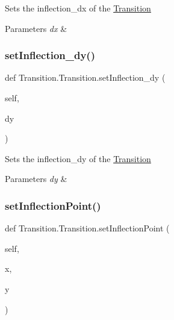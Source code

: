 Sets the inflection\+\_\+dx of the \mbox{\hyperlink{classTransition_1_1Transition}{Transition}}   


\begin{DoxyParams}{Parameters}
{\em dx} & \\
\hline
\end{DoxyParams}
\mbox{\label{classTransition_1_1Transition_a45a43d47163d7809870bfe7eb0e7613b}} 
\subsubsection{\texorpdfstring{setInflection\_dy()}{setInflection\_dy()}}
{\footnotesize\ttfamily def Transition.\+Transition.\+set\+Inflection\+\_\+dy (\begin{DoxyParamCaption}\item[{}]{self,  }\item[{}]{dy }\end{DoxyParamCaption})}



Sets the inflection\+\_\+dy of the \mbox{\hyperlink{classTransition_1_1Transition}{Transition}}   


\begin{DoxyParams}{Parameters}
{\em dy} & \\
\hline
\end{DoxyParams}
\mbox{\label{classTransition_1_1Transition_a42224afec5eb79e2ced9d502d4470bcc}} 
\subsubsection{\texorpdfstring{setInflectionPoint()}{setInflectionPoint()}}
{\footnotesize\ttfamily def Transition.\+Transition.\+set\+Inflection\+Point (\begin{DoxyParamCaption}\item[{}]{self,  }\item[{}]{x,  }\item[{}]{y }\end{DoxyParamCaption})}



